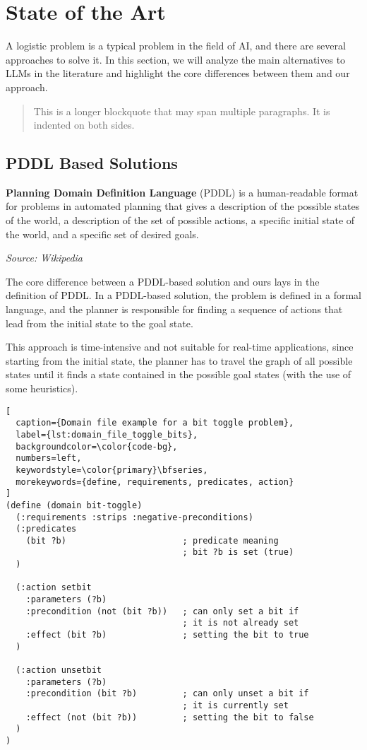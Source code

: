 \section{State of the Art}
\label{sec:state_of_the_art}

A logistic problem is a typical problem in the field of AI, and there are
several approaches to solve it. In this section, we will analyze the main
alternatives to LLMs in the literature and highlight the core differences
between them and our approach.

\begin{quotation}
  This is a longer blockquote that may span multiple paragraphs. It is indented
  on both sides.
\end{quotation}

\subsection{PDDL Based Solutions}
\begin{blockquote}
  \textbf{Planning Domain Definition Language} (PDDL) is a human-readable format
  for problems in automated planning that gives a description of the possible
  states of the world, a description of the set of possible actions, a specific
  initial state of the world, and a specific set of desired goals.

  \emph{Source: Wikipedia \cite{wiki-pddl}}
\end{blockquote}

The core difference between a PDDL-based solution and ours lays in the
definition of PDDL. In a PDDL-based solution, the problem is defined in a formal
language, and the planner is responsible for finding a sequence of actions that lead
from the initial state to the goal state.

This approach is time-intensive and not suitable for real-time applications,
since starting from the initial state, the planner has to travel the graph of all
possible states until it finds a state contained in the possible goal states (with
the use of some heuristics).

\begin{lstlisting}[
  caption={Domain file example for a bit toggle problem},
  label={lst:domain_file_toggle_bits},
  backgroundcolor=\color{code-bg},
  numbers=left,
  keywordstyle=\color{primary}\bfseries,
  morekeywords={define, requirements, predicates, action}
]
(define (domain bit-toggle)
  (:requirements :strips :negative-preconditions)
  (:predicates
    (bit ?b)                       ; predicate meaning
                                   ; bit ?b is set (true)
  )

  (:action setbit
    :parameters (?b)
    :precondition (not (bit ?b))   ; can only set a bit if
                                   ; it is not already set
    :effect (bit ?b)               ; setting the bit to true
  )

  (:action unsetbit
    :parameters (?b)
    :precondition (bit ?b)         ; can only unset a bit if
                                   ; it is currently set
    :effect (not (bit ?b))         ; setting the bit to false
  )
)
\end{lstlisting}

